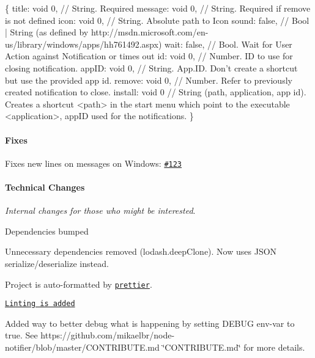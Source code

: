\begin{DoxyCode}
\{
  title: void 0, // String. Required
  message: void 0, // String. Required if remove is not defined
  icon: void 0, // String. Absolute path to Icon
  sound: false, // Bool | String (as defined by
       http://msdn.microsoft.com/en-us/library/windows/apps/hh761492.aspx)
  wait: false, // Bool. Wait for User Action against Notification or times out
  id: void 0, // Number. ID to use for closing notification.
  appID: void 0, // String. App.ID. Don't create a shortcut but use the provided app id.
  remove: void 0, // Number. Refer to previously created notification to close.
  install: void 0 // String (path, application, app id).  Creates a shortcut <path> in the start menu which
       point to the executable <application>, appID used for the notifications.
\}
\end{DoxyCode}


\paragraph*{Fixes}


\begin{DoxyEnumerate}
\item Fixes new lines on messages on Windows\+: \href{https://github.com/mikaelbr/node-notifier/issues/123}{\tt \#123}
\end{DoxyEnumerate}

\paragraph*{Technical Changes}

{\itshape Internal changes for those who might be interested}.


\begin{DoxyEnumerate}
\item Dependencies bumped
\item Unnecessary dependencies removed ({\ttfamily lodash.\+deep\+Clone}). Now uses J\+S\+ON serialize/deserialize instead.
\item Project is auto-\/formatted by \href{https://github.com/jlongster/prettier}{\tt {\ttfamily prettier}}.
\item \href{https://github.com/mikaelbr/node-notifier/blob/master/.eslintrc}{\tt Linting is added}
\item Added way to better debug what is happening by setting {\ttfamily D\+E\+B\+UG} env-\/var to {\ttfamily true}. See https\+://github.com/mikaelbr/node-\/notifier/blob/master/\+C\+O\+N\+T\+R\+I\+B\+U\+T\+E.\+md \char`\"{}\+C\+O\+N\+T\+R\+I\+B\+U\+T\+E.\+md\char`\"{} for more details.
\end{DoxyEnumerate}

